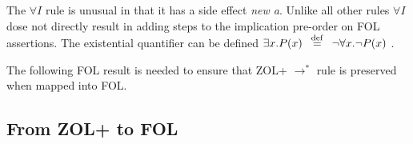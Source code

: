 The $\forall I$ rule is unusual in that it has a side effect \emph{new a}. Unlike all other rules $\forall I$ dose not directly result in adding steps to the implication pre-order on FOL assertions. The existential quantifier can be defined $\exists x.P(x) \defeq \neg \forall x. \neg P(x)$ .


The following FOL result is needed to ensure that ZOL+ $\rightarrow^*$ rule is preserved when mapped into FOL.


\hspace{\fill}
\begin{minipage}{2in}
\begin{prooftree}
\end{prooftree}
\end{minipage}
\hspace{\fill}
\begin{minipage}{2in}
\begin{prooftree}
 
 

 
 
 
\end{prooftree}
\end{minipage}
\hspace{\fill}

\subsection{From ZOL+ to FOL}

